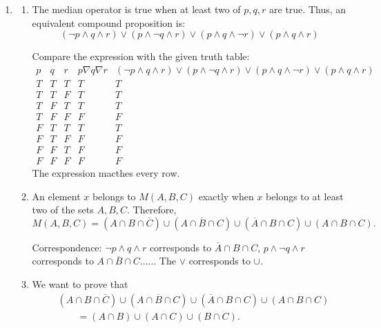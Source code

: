 \documentclass[12pt]{article}
\begin{document}
\begin{enumerate}
     \item[(a)]
     \begin{enumerate}
        \item[i.]
        
        The median operator is true when at least two of $p,q,r$ are true. Thus, an equivalent compound proposition is:
        \[
        (\neg p\land q \land r)\lor(p\land \neg q \land r)\lor(p\land q \land \neg r)\lor(p\land q \land r)
        \]
        
        Compare the expression with the given truth table:
        \[
        \begin{array}{ccc|c|c}
        p&q&r&p\nabla q\nabla r&(\neg p\land q \land r)\lor(p\land \neg q \land r)\lor(p\land q \land \neg r)\lor(p\land q \land r)\\
        \hline
        T&T&T&T&T\\
        T&T&F&T&T\\
        T&F&T&T&T\\
        T&F&F&F&F\\
        F&T&T&T&T\\
        F&T&F&F&F\\
        F&F&T&F&F\\
        F&F&F&F&F
        \end{array}
        \]
        The expression macthes every row.
        
        \item[ii.]
        
        An element $x$ belongs to $M(A,B,C)$ exactly when
        $x$ belongs to at least two of the sets $A,B,C$. Therefore,
        \[
        M(A,B,C)
        =
        (A\cap B \cap \overline{C})\cup(A\cap \overline{B} \cap C)\cup(\overline{A}\cap B \cap C)\cup(A\cap B \cap C).
        \]
        
        Correspondence: $\neg p\land q \land r$ corresponds to $\overline{A}\cap B \cap C$, $p\land \neg q \land r$ corresponds to $A\cap \overline{B} \cap C$...... The $\lor$ corresponds to $\cup$.
        
        \item[iii.]

        We want to prove that
        \[
        \begin{aligned}
        &(A\cap B\cap\overline{C})
        \cup(A\cap\overline{B}\cap C)
        \cup(\overline{A}\cap B\cap C)
        \cup(A\cap B\cap C)\\
        &\qquad=
        (A\cap B)\cup(A\cap C)\cup(B\cap C).
        \end{aligned}
        \]
        

\end{enumerate}
\end{enumerate}
\end{document}
